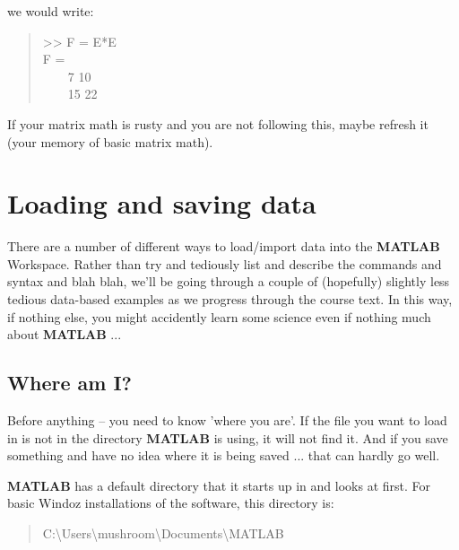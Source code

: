 \documentclass{tufte-book} %
\newenvironment{docspec}{\begin{quotation}\ttfamily\parskip0pt\parindent0pt\ignorespaces}{\end{quotation}}
\begin{document}
we would write:

\begin{docspec}
>> F = E*E
\\
F =\\
\ \ \ \  7    10\\
\ \ \ \ 15    22
\end{docspec}

If your matrix math is rusty and you are not following this, maybe refresh it (your memory of basic matrix math).


\newpage


\section{Loading and saving data}

There are a number of different ways to load/import data into the \textbf{MATLAB} \textsf{Workspace}. Rather than try and tediously list and describe the commands and syntax and blah blah, we'll be going through a couple of (hopefully) slightly less tedious data-based examples as we progress through the course text. In this way, if nothing else, you might accidently learn some science even if nothing much about \textbf{MATLAB} ...


\subsection{Where am I?}

Before anything -- you need to know 'where you are'. If the file you want to load in is not in the directory \textbf{MATLAB} is using, it will not find it. And if you save something and have no idea where it is being saved ... that can hardly go well.

\textbf{MATLAB} has a default directory that it starts up in and looks at first. For basic Windoz installations of the software, this directory is:

\begin{docspec}
C:\textbackslash Users\textbackslash mushroom\textbackslash Documents\textbackslash MATLAB
\end{docspec}
\end{document}
